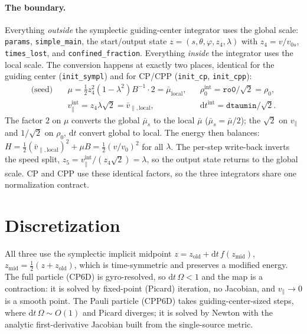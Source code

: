 \documentclass[11pt]{article}
\newcommand{\dd}{\mathrm{d}}
\newcommand{\half}{\tfrac12}
\begin{document}
\paragraph{The boundary.}
Everything \emph{outside} the symplectic guiding-center integrator uses the
global scale: \texttt{params}, \texttt{simple\_main}, the start/output state
$z=(s,\theta,\varphi,z_4,\lambda)$ with $z_4=v/v_{0s}$, \texttt{times\_lost}, and
\texttt{confined\_fraction}. Everything \emph{inside} the integrator uses the
local scale. The conversion happens at exactly two places, identical for the
guiding center (\texttt{init\_sympl}) and for CP/CPP (\texttt{init\_cp},
\texttt{init\_cpp}):
\begin{align}
\text{(seed)}\quad
&\mu=\half z_4^2(1-\lambda^2)B^{-1}\!\cdot 2=\bar\mu_{\mathrm{local}},
&&\rho_0^{\mathrm{int}}=\mathtt{ro0}/\sqrt2=\rho_0,\\
&v_\parallel^{\mathrm{int}}=z_4\lambda\sqrt2=\bar v_{\parallel,\mathrm{local}},
&&\dd t^{\mathrm{int}}=\mathtt{dtaumin}/\sqrt2 .
\end{align}
The factor $2$ on $\mu$ converts the global $\bar\mu_s$ to the local $\bar\mu$
($\bar\mu_s=\bar\mu/2$); the $\sqrt2$ on $v_\parallel$ and $1/\sqrt2$ on $\rho_0$,
$\dd t$ convert global to local. The energy then balances:
$H=\half(\bar v_{\parallel,\mathrm{local}})^2+\mu B=\half(v/v_0)^2$ for all
$\lambda$. The per-step write-back inverts the speed split,
$z_5=v_\parallel^{\mathrm{int}}/(z_4\sqrt2)=\lambda$, so the output state returns
to the global scale. CP and CPP use these identical factors, so the three
integrators share one normalization contract.

\section{Discretization}
All three use the symplectic implicit midpoint
$z=z_{\mathrm{old}}+\dd t\,f(z_{\mathrm{mid}})$,
$z_{\mathrm{mid}}=\half(z+z_{\mathrm{old}})$, which is time-symmetric and
preserves a modified energy. The full particle (CP6D) is gyro-resolved, so
$\dd t\,\Omega<1$ and the map is a contraction: it is solved by fixed-point
(Picard) iteration, no Jacobian, and $v_\parallel\to0$ is a smooth point. The Pauli
particle (CPP6D) takes guiding-center-sized steps, where $\dd t\,\Omega\sim O(1)$
and Picard diverges; it is solved by Newton with the analytic first-derivative
Jacobian built from the single-source metric.
\end{document}
